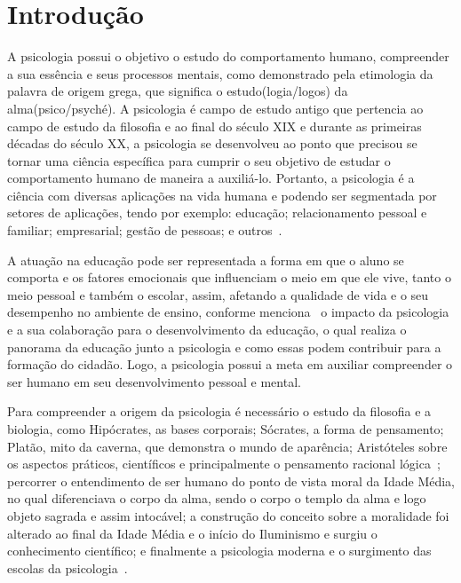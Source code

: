\section{Introdução}\label{intro}

A psicologia possui o objetivo o estudo do comportamento humano, compreender a sua
essência e seus processos mentais, como demonstrado pela etimologia da palavra de origem grega, que significa o estudo(logia/logos) da alma(psico/psyché). 
A psicologia é campo de estudo antigo que pertencia ao campo de estudo da filosofia e ao final do século XIX e durante as primeiras décadas do século XX, a psicologia se desenvolveu ao ponto que precisou se tornar uma ciência específica para cumprir o seu objetivo de estudar o comportamento humano de maneira a auxiliá-lo. 
Portanto, a psicologia é a ciência com diversas aplicações na vida humana e podendo ser segmentada por setores de aplicações, tendo por exemplo: educação; relacionamento pessoal e familiar; empresarial; gestão de pessoas; e outros~\cite{freitas2008historia}.

A atuação na educação pode ser representada a forma em que o aluno se comporta e os fatores emocionais que influenciam o meio em que ele vive, tanto o meio pessoal e também o escolar, assim, afetando a qualidade de vida e o seu desempenho no ambiente de ensino, conforme menciona~ o impacto da psicologia e a sua colaboração para o desenvolvimento da educação, o qual realiza o panorama da educação junto a psicologia e como essas podem contribuir para a formação do cidadão.
Logo, a psicologia possui a meta em auxiliar compreender o ser humano em seu desenvolvimento pessoal e mental. 

Para compreender a origem da psicologia é necessário o estudo da filosofia e a biologia, como Hipócrates, as bases corporais; Sócrates, a forma de pensamento; Platão, mito da caverna, que demonstra o mundo de aparência; Aristóteles sobre os aspectos práticos, científicos e principalmente o pensamento racional lógica~\cite{marcondes1997filosofia}; percorrer o entendimento de ser humano do ponto de vista moral da Idade Média, no qual diferenciava o corpo da alma, sendo o corpo o templo da alma e logo objeto sagrada e assim intocável; a construção do conceito sobre a moralidade foi alterado ao final da Idade Média e o início do Iluminismo e surgiu o conhecimento científico; e finalmente a psicologia moderna e o surgimento das escolas da psicologia~\cite{bock1999psicologias,freitas2008historia}. 

